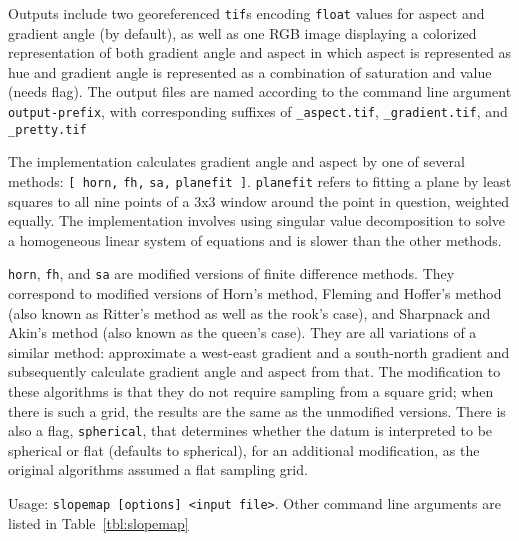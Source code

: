 Outputs include two georeferenced \verb#tif#s encoding \verb#float# values for aspect and gradient angle (by default), as well as one RGB image displaying a colorized representation of both gradient angle and aspect in which aspect is represented as hue and 
gradient angle is represented as a combination of saturation and value (needs flag). The output files are named according to the command line argument \verb#output-prefix#, with corresponding suffixes of \verb#_aspect.tif#, \verb#_gradient.tif#, and \verb#_pretty.tif#

The implementation calculates gradient angle and aspect by one of several methods: \verb#[ horn,# \verb#fh,# \verb#sa,# \verb#planefit ]#. \verb#planefit# refers to fitting a plane by least squares to all nine points of a 3x3 window around the point in question, weighted equally. The implementation involves using singular value decomposition to solve a homogeneous linear system of equations and is slower than the other methods. 

\verb#horn#, \verb#fh#, and \verb#sa# are modified versions of finite difference methods. They correspond to modified versions of Horn's method, Fleming and Hoffer's method (also known as Ritter's method as well as the rook's case), and Sharpnack and Akin's method (also known as the queen's case). They are all variations of a similar method: approximate a west-east gradient and a south-north gradient and subsequently calculate gradient angle and aspect from that. The modification to these algorithms is that they do not require sampling from a square grid; when there is such a grid, the results are the same as the unmodified versions. There is also a flag, \verb#spherical#, that determines whether the datum is interpreted to be spherical or flat (defaults to spherical), for an additional modification, as the original algorithms assumed a flat sampling grid. 

Usage: \verb#slopemap [options] <input file>#. Other command line arguments are listed in Table~\ref{tbl:slopemap}

